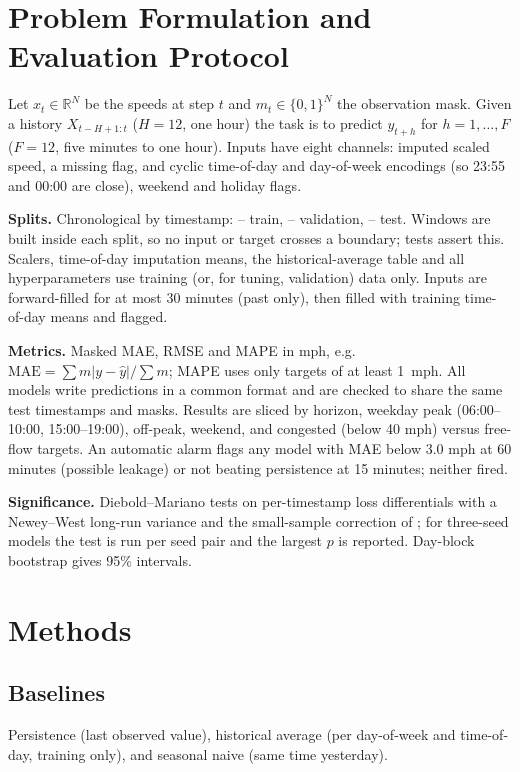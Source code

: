 \documentclass[conference]{IEEEtran}
\begin{document}
\section{Problem Formulation and Evaluation Protocol}
Let $x_t\in\mathbb{R}^{N}$ be the speeds at step $t$ and $m_t\in\{0,1\}^N$ the observation mask.
Given a history $X_{t-H+1:t}$ ($H=12$, one hour) the task is to predict $y_{t+h}$ for $h=1,\dots,F$ ($F=12$, five minutes to one hour).
Inputs have eight channels: imputed scaled speed, a missing flag, and cyclic time-of-day and day-of-week encodings (so 23:55 and 00:00 are close), weekend and holiday flags.

\textbf{Splits.} Chronological by timestamp: \splitTrainStart--\splitTrainEnd{} train, \splitValStart--\splitValEnd{} validation, \splitTestStart--\splitTestEnd{} test.
Windows are built inside each split, so no input or target crosses a boundary; tests assert this.
Scalers, time-of-day imputation means, the historical-average table and all hyperparameters use training (or, for tuning, validation) data only.
Inputs are forward-filled for at most 30 minutes (past only), then filled with training time-of-day means and flagged.

\textbf{Metrics.} Masked MAE, RMSE and MAPE in mph, e.g.\ $\mathrm{MAE}=\sum m|y-\hat y|/\sum m$; MAPE uses only targets of at least 1~mph.
All models write predictions in a common format and are checked to share the same test timestamps and masks.
Results are sliced by horizon, weekday peak (06:00--10:00, 15:00--19:00), off-peak, weekend, and congested (below 40 mph) versus free-flow targets.
An automatic alarm flags any model with MAE below 3.0 mph at 60 minutes (possible leakage) or not beating persistence at 15 minutes; neither fired.

\textbf{Significance.} Diebold--Mariano tests \cite{diebold1995comparing} on per-timestamp loss differentials with a Newey--West long-run variance \cite{newey1987simple} and the small-sample correction of \cite{harvey1997testing}; for three-seed models the test is run per seed pair and the largest $p$ is reported. Day-block bootstrap gives 95\% intervals.

\section{Methods}
\subsection{Baselines}
Persistence (last observed value), historical average (per day-of-week and time-of-day, training only), and seasonal naive (same time yesterday).
\end{document}
